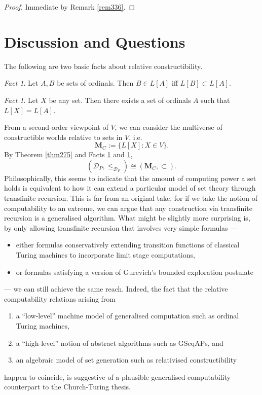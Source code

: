 \documentclass[12pt, twoside]{memoir}
\numberwithin{equation}{section}
\theoremstyle{definition}
\theoremstyle{remark}
\newtheorem{fact}[thm]{Fact}
\theoremstyle{definition}
\theoremstyle{definition}
\theoremstyle{definition}
\theoremstyle{remark}
\begin{document}
\begin{proof}
Immediate by Remark \ref{rem336}.
\end{proof}

\section{Discussion and Questions}

The following are two basic facts about relative constructibility.

\begin{fact}\label{fact276}
Let $A, B$ be sets of ordinals. Then $B \in L[A]$ iff $L[B] \subset L[A]$.
\end{fact}

\begin{fact}\label{fact277}
Let $X$ be any set. Then there exists a set of ordinals $A$ such that $L[X] = L[A]$.
\end{fact}

From a second-order viewpoint of $V$, we can consider the multiverse of constructible worlds relative to sets in $V$, i.e.
\begin{equation*}
    \mathbf{M}_C := \{L[X] : X \in V\} \text{.}
\end{equation*}
By Theorem \ref{thm275} and Facts \ref{fact276} and \ref{fact277}, 
\begin{equation*}
    (\mathcal{D}_P, \leq_{\mathcal{D}_P}) \cong (\mathbf{M}_C, \subset) \text{.}
\end{equation*}
Philosophically, this seems to indicate that the amount of computing power a set holds is equivalent to how it can extend a particular model of set theory through transfinite recursion. This is far from an original take, for if we take the notion of computability to an extreme, we can argue that any construction via transfinite recursion is a generalised algorithm. What might be slightly more surprising is, by only allowing transfinite recursion that involves very simple formulas ---
\begin{itemize}
    \item either formulas conservatively extending transition functions of classical Turing machines to incorporate limit stage computations,
    \item or formulas satisfying a version of Gurevich's bounded exploration postulate
\end{itemize}
--- we can still achieve the same reach. Indeed, the fact that the relative computability relations arising from
\begin{enumerate}[label=(GCT\arabic*), leftmargin=50pt]
    \item\label{gct1} a ``low-level'' machine model of generalised computation such as ordinal Turing machines, 
    \item\label{gct2} a ``high-level'' notion of abstract algorithms such as GSeqAPs, and
    \item\label{gct3} an algebraic model of set generation such as relativised constructibility
\end{enumerate}
happen to coincide, is suggestive of a plausible generalised-computability counterpart to the Church-Turing thesis.
\end{document}
